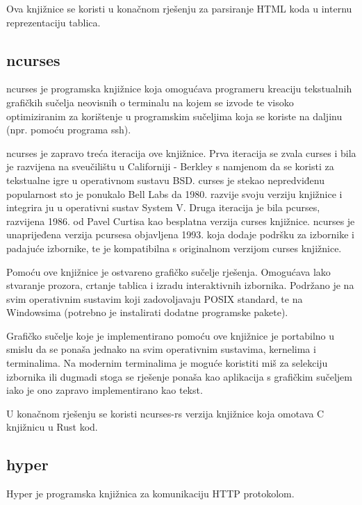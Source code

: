 \documentclass[times, utf8, zavrsni]{fer}
\begin{document}
Ova knjižnice se koristi u konačnom rješenju za parsiranje HTML koda u
internu reprezentaciju tablica.

\subsection{ncurses}

ncurses \cite{ncurses_documentation} je programska knjižnice koja omogućava
programeru kreaciju
tekstualnih grafičkih sučelja neovisnih o terminalu na kojem se izvode te
visoko optimiziranim za korištenje u programskim sučeljima koja se koriste na
daljinu (npr. pomoću programa ssh).

ncurses je zapravo treća iteracija ove knjižnice. Prva iteracija se zvala
curses i bila je razvijena na sveučilištu u Californiji - Berkley s namjenom
da se koristi za tekstualne igre u operativnom sustavu BSD. curses je stekao
nepredviđenu popularnost sto je ponukalo Bell Labs da 1980. razvije svoju
verziju knjižnice i integrira ju u operativni sustav System V. Druga
iteracija je bila pcurses, razvijena 1986. od Pavel Curtisa kao besplatna
verzija curses knjižnice. ncurses je unaprijeđena verzija pcursesa objavljena
1993. koja dodaje podršku za izbornike i padajuće izbornike, te je kompatibilna
s originalnom verzijom curses knjižnice.

Pomoću ove knjižnice je ostvareno grafičko sučelje rješenja. Omogućava lako
stvaranje prozora, crtanje tablica i izradu interaktivnih izbornika. Podržano
je na svim operativnim sustavim koji zadovoljavaju POSIX standard, te na
Windowsima (potrebno je instalirati dodatne programske pakete).

Grafičko sučelje koje je implementirano pomoću ove knjižnice je portabilno u
smislu da se ponaša jednako na svim operativnim sustavima, kernelima i
terminalima. Na modernim terminalima je moguće koristiti miš za selekciju
izbornika ili dugmadi stoga se rješenje ponaša kao aplikacija s grafičkim
sučeljem iako je ono zapravo implementirano kao tekst.

U konačnom rješenju se koristi ncurses-rs \cite{ncurses_rs_repository} verzija
knjižnice koja omotava C knjižnicu u Rust kod.

\subsection{hyper}

Hyper \cite{hyper_repository} je programska knjižnica za komunikaciju HTTP
protokolom.
\end{document}
